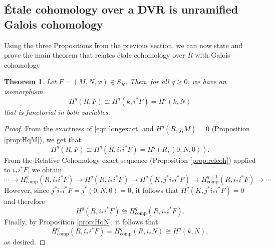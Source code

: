 \documentclass{article}
\newcommand{\comp}{\mathrm{comp}}
\theoremstyle{plain}
\newtheorem{theorem}{Theorem}[section]
\theoremstyle{definition}
\begin{document}
    \subsection{\'{E}tale cohomology over a DVR is unramified Galois cohomology}
    Using the three Propositions from the previous section, we can now state and prove the main theorem that relates \'{e}tale cohomology over $R$ with Galois cohomology
    \begin{theorem}
        Let $F=(M,N,\varphi)\in S_R$. Then, for all $q\geq0$, we have an isomorphism
        $$H^q(R,F)\cong H^q(k,i^*F)=H^q(k,N)$$
        that is functorial in both variables.
    \end{theorem}
    \begin{proof}
        From the exactness of \eqref{eqn:longexact} and $H^q(R,j_!M)=0$ (Proposition \ref{prop:HqM}), we get that 
        $$H^q(R,F)\cong H^q(R,i_*i^*F)=H^q(R,(0,N,0)).$$
        From the Relative Cohomology exact sequence (Proposition \ref{prop:relcoh}) applied to $i_*i^*F$, we obtain 
        \begin{equation}
            \cdots\longrightarrow H^q_{\comp}(R,i_*i^*F)\longrightarrow H^q(R,i_*i^*F)\longrightarrow H^q(K,j^*i_*i^*F)\longrightarrow H^{q+1}_{\comp}(R,i_*i^*F)\longrightarrow\cdots 
        \end{equation}
        However, since $j^*i_*i^*F=j^*(0,N,0)=0$, it follows that $H^q(K,j^*i_*i^*F)=0$ and therefore
        $$H^q(R,i_*i^*F)\cong H^q_{\comp}(R,i_*i^*F).$$
        Finally, by Proposition \ref{prop:HqN}, it follows that 
        $$H^q_{\comp}(R,i_*i^*F)=H^q_{\comp}(R,i_*N)\cong H^q(k,N),$$
        as desired.
    \end{proof}
    \newpage

\end{document}

